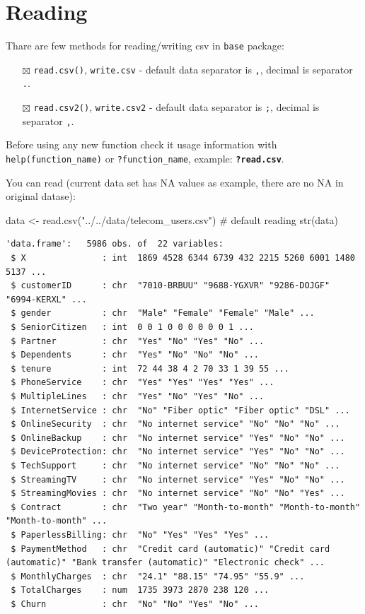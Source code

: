\documentclass[
  letterpaper,
  DIV=11,
  numbers=noendperiod]{scrreprt}
\newenvironment{Shaded}{\begin{snugshade}}{\end{snugshade}}
\newcommand{\CommentTok}[1]{\textcolor[rgb]{0.37,0.37,0.37}{#1}}
\newcommand{\FunctionTok}[1]{\textcolor[rgb]{0.28,0.35,0.67}{#1}}
\newcommand{\NormalTok}[1]{\textcolor[rgb]{0.00,0.23,0.31}{#1}}
\newcommand{\OtherTok}[1]{\textcolor[rgb]{0.00,0.23,0.31}{#1}}
\newcommand{\StringTok}[1]{\textcolor[rgb]{0.13,0.47,0.30}{#1}}
\providecommand{\tightlist}{%
  \setlength{\itemsep}{0pt}\setlength{\parskip}{0pt}}\usepackage{longtable,booktabs,array}
\begin{document}
\section{Reading}\label{reading}

Thare are few methods for reading/writing csv in \texttt{base} package:

\begin{itemize}
\tightlist
\item[$\boxtimes$]
  \texttt{read.csv()}, \texttt{write.csv} - default data separator is
  \texttt{,}, decimal is separator \texttt{.}.
\item[$\boxtimes$]
  \texttt{read.csv2()}, \texttt{write.csv2} - default data separator is
  \texttt{;}, decimal is separator \texttt{,}.
\end{itemize}

Before using any new function check it usage information with
\texttt{help(function\_name)} or \texttt{?function\_name}, example:
\textbf{\texttt{?read.csv}}.

You can read (current data set has NA values as example, there are no NA
in original datase):

\begin{Shaded}
\begin{Highlighting}[]
\NormalTok{data }\OtherTok{\textless{}{-}} \FunctionTok{read.csv}\NormalTok{(}\StringTok{"../../data/telecom\_users.csv"}\NormalTok{) }\CommentTok{\# default reading}
\FunctionTok{str}\NormalTok{(data)}
\end{Highlighting}
\end{Shaded}

\begin{verbatim}
'data.frame':   5986 obs. of  22 variables:
 $ X               : int  1869 4528 6344 6739 432 2215 5260 6001 1480 5137 ...
 $ customerID      : chr  "7010-BRBUU" "9688-YGXVR" "9286-DOJGF" "6994-KERXL" ...
 $ gender          : chr  "Male" "Female" "Female" "Male" ...
 $ SeniorCitizen   : int  0 0 1 0 0 0 0 0 0 1 ...
 $ Partner         : chr  "Yes" "No" "Yes" "No" ...
 $ Dependents      : chr  "Yes" "No" "No" "No" ...
 $ tenure          : int  72 44 38 4 2 70 33 1 39 55 ...
 $ PhoneService    : chr  "Yes" "Yes" "Yes" "Yes" ...
 $ MultipleLines   : chr  "Yes" "No" "Yes" "No" ...
 $ InternetService : chr  "No" "Fiber optic" "Fiber optic" "DSL" ...
 $ OnlineSecurity  : chr  "No internet service" "No" "No" "No" ...
 $ OnlineBackup    : chr  "No internet service" "Yes" "No" "No" ...
 $ DeviceProtection: chr  "No internet service" "Yes" "No" "No" ...
 $ TechSupport     : chr  "No internet service" "No" "No" "No" ...
 $ StreamingTV     : chr  "No internet service" "Yes" "No" "No" ...
 $ StreamingMovies : chr  "No internet service" "No" "No" "Yes" ...
 $ Contract        : chr  "Two year" "Month-to-month" "Month-to-month" "Month-to-month" ...
 $ PaperlessBilling: chr  "No" "Yes" "Yes" "Yes" ...
 $ PaymentMethod   : chr  "Credit card (automatic)" "Credit card (automatic)" "Bank transfer (automatic)" "Electronic check" ...
 $ MonthlyCharges  : chr  "24.1" "88.15" "74.95" "55.9" ...
 $ TotalCharges    : num  1735 3973 2870 238 120 ...
 $ Churn           : chr  "No" "No" "Yes" "No" ...
\end{verbatim}
\end{document}
